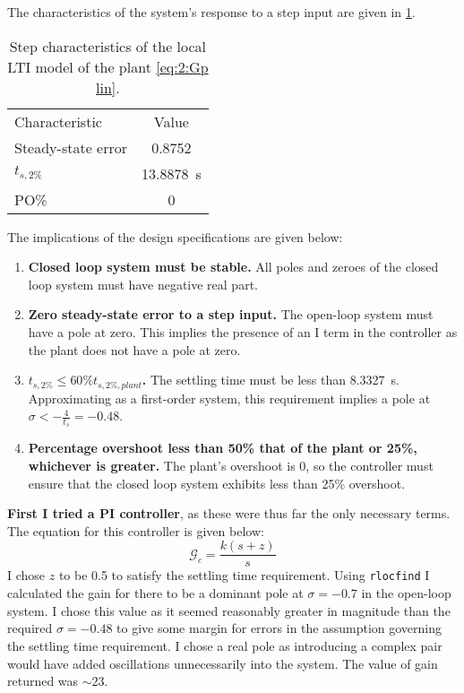 The characteristics of the system's response to a step input are given in \cref{tab:2:lin step}. 

\begin{table}[h]
	\centering
	\begin{tabular}{lc}
		\toprule
		Characteristic&Value\\
		\cmidrule(r){1-1}\cmidrule(l){2-2}
		Steady-state error&0.8752\\
		$t_{s,2\%}$&\SI{13.8878}{\second}\\
		PO\%&0\\
		\bottomrule
	\end{tabular}
	\caption{Step characteristics of the local LTI model of the plant \cref{eq:2:Gp lin}.}
	\label{tab:2:lin step}
\end{table}

The implications of the design specifications are given below:
\begin{enumerate}
	\item \textbf{Closed loop system must be stable.} All poles and zeroes of the closed loop system must have negative real part.
	\item \textbf{Zero steady-state error to a step input.} The open-loop system must have a pole at zero. This implies the presence of an I term in the controller as the plant does not have a pole at zero.
	\item \textbf{$t_{s,2\%} \leq 60\% t_{s,2\%,plant}$.} The settling time must be less than \SI{8.3327}{\second}. Approximating as a first-order system, this requirement implies a pole at $\sigma < -\frac{4}{t_s} = -0.48$.
	\item \textbf{Percentage overshoot less than 50\% that of the plant or 25\%, whichever is greater.} The plant's overshoot is 0, so the controller must ensure that the closed loop system exhibits less than 25\% overshoot.
\end{enumerate}

\textbf{First I tried a PI controller}, as these were thus far the only necessary terms. The equation for this controller is given below:
\begin{equation}
	\label{eq:2:PI}
	\mathcal{G}_c = \frac{k(s+z)}{s}
\end{equation}
I chose $z$ to be 0.5 to satisfy the settling time requirement. Using \texttt{rlocfind} I calculated the gain for there to be a dominant pole at $\sigma = -0.7$ in the open-loop system. I chose this value as it seemed reasonably greater in magnitude than the required $\sigma = -0.48$ to give some margin for errors in the assumption governing the settling time requirement. I chose a real pole as introducing a complex pair would have added oscillations unnecessarily into the system. The value of gain returned was $\sim 23$.

